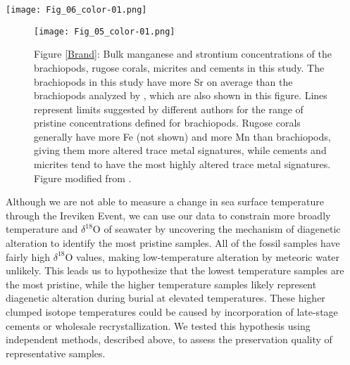 \documentclass[5p, authoryear]{elsarticle}
\begin{document}
\begin{figure*}[b]
\centering
\texttt{[image: Fig\_06\_color-01.png]}
\captionsetup{labelformat=empty} 
\caption{Figure \ref{metals}: Scatter plots showing the relationship between temperature and bulk trace metal concentrations. The negative correlation between temperature and the log of Sr concentration in rugose corals is weakly significant and strengthens when combined with the rest of the samples. There are also weakly significant positive correlations between temperature and the log of Fe concentration and between temperature and the log of Mn concentration among all the samples combined. These plots demonstrate clear differences in trace metal content between the two fossil taxa and the later carbonate phases. Brachiopods have the lowest average temperature of all the sample subsets, and also tend to have the most pristine trace metal signatures, with less Fe and Mn than the other samples. Micrites and cements have the highest average temperature and tend to have the most altered trace metal signatures, with high Fe and Mn concentrations.}
\label{Brand}
\end{figure*}

\begin{figure}[t]
\centering
\texttt{[image: Fig\_05\_color-01.png]}
\captionsetup{labelformat=empty} 
\caption{Figure \ref{Brand}: Bulk manganese and strontium concentrations of the brachiopods, rugose corals, micrites and cements in this study. The brachiopods in this study have more Sr on average than the brachiopods analyzed by \cite{Brand2012}, which are also shown in this figure. Lines represent limits suggested by different authors for the range of pristine concentrations defined for brachiopods. Rugose corals generally have more Fe (not shown) and more Mn than brachiopods, giving them more altered trace metal signatures, while cements and micrites tend to have the most highly altered trace metal signatures. Figure modified from \cite{Brand2012}.}
\label{metals}
\end{figure}

Although we are not able to measure a change in sea surface temperature through the Ireviken Event, we can use our data to constrain more broadly temperature and $\delta^{18}$O of seawater by uncovering the mechanism of diagenetic alteration to identify the most pristine samples. All of the fossil samples have fairly high $\delta^{18}$O values, making low-temperature alteration by meteoric water unlikely. This leads us to hypothesize that the lowest temperature samples are the most pristine, while the higher temperature samples likely represent diagenetic alteration during burial at elevated temperatures. These higher clumped isotope temperatures could be caused by incorporation of late-stage cements or wholesale recrystallization. We tested this hypothesis using independent methods, described above, to assess the preservation quality of representative samples. 
\end{document}

